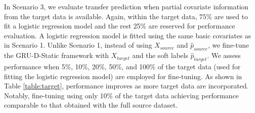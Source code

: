 \documentclass[fleqn,10pt]{wlscirep}
\begin{document}
In Scenario 3, we evaluate transfer prediction when partial covariate information from the target data is available. Again, within the target data, 75\% are used to fit a logistic regression model and the rest 25\% are reserved for performance evaluation. A logistic regression model is fitted using the same basic covariates as in Scenario 1. Unlike Scenario 1, instead of using $X_{source}$ and $\hat{p}_{source}$, we fine-tune the GRU-D-Static framework with $X_{target}$ and the soft labels $\hat{p}_{target}$. We assess performance when 5\%, 10\%, 20\%, 50\%, and 100\% of the target data (used for fitting the logistic regression model) are employed for fine-tuning. As shown in Table \ref{table:target}, performance improves as more target data are incorporated. Notably, fine-tuning using only 10\% of the target data achieving performance comparable to that obtained with the full source dataset.
\end{document}
